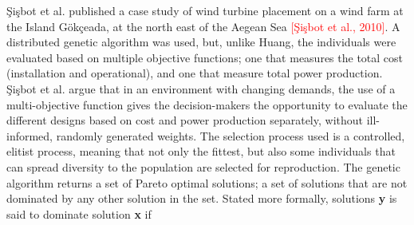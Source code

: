 %
%


\noindent \c{S}i\c{s}bot et al. published a case study of wind turbine placement on a wind farm at the Island G{\"o}k\c{c}eada, at the north east of the Aegean Sea \textcolor{red}{[\c{S}i\c{s}bot et al., 2010]}. A distributed genetic algorithm was used, but, unlike Huang, the individuals were evaluated based on multiple objective functions; one that measures the total cost (installation and operational), and one that measure total power production. \c{S}i\c{s}bot et al. argue that in an environment with changing demands, the use of a multi-objective function gives the decision-makers the opportunity to evaluate the different designs based on cost and power production separately, without ill-informed, randomly generated weights. The selection process used is a controlled, elitist process, meaning that not only the fittest, but also some individuals that can spread diversity to the population are selected for reproduction. The genetic algorithm returns a set of Pareto optimal solutions; a set of solutions that are not dominated by any other solution in the set. Stated more formally, solutions \textbf{y} is said to dominate solution \textbf{x} if

